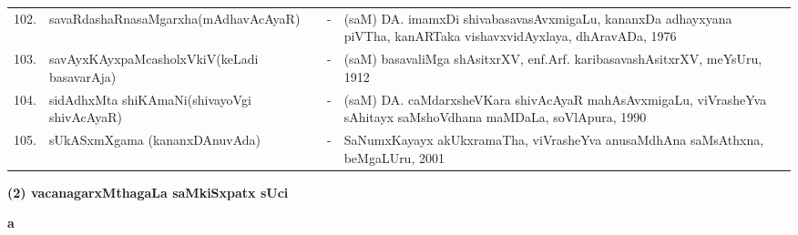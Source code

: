 {\begin{longtable}{lp{5cm}cp{5cm}<{\raggedright}p{3cm}<{\raggedright}@{}}
102. & savaRdashaRnasaMgarxha\newline (mAdhavAcAyaR) &-& (saM) DA. imamxDi shivabasavasAvxmigaLu, kananxDa adhayxyana piVTha, kanARTaka vishavxvidAyxlaya, dhAravADa, 1976\\
103. & savAyxKAyxpaMcasholxVkiV\newline (keLadi basavarAja) &-& (saM) basavaliMga shAsitxrXV, enf.Arf. karibasavashAsitxrXV, meYsUru, 1912\\
104. & sidAdhxMta shiKAmaNi\newline (shivayoVgi shivAcAyaR) &-& (saM) DA. caMdarxsheVKara shivAcAyaR mahAsAvxmigaLu, viVrasheYva sAhitayx saMshoVdhana maMDaLa, soVlApura, 1990\\
105. & sUkASxmXgama (kananxDAnuvAda) &-& SaNumxKayayx akUkxramaTha, viVrasheYva anusaMdhAna saMsAthxna, beMgaLUru, 2001\\
\hline
\end{longtable}}


\newpage

\begin{center}
{\large\bf (2) vacanagarxMthagaLa saMkiSxpatx sUci}
\end{center}

\medskip

\centerline{\bf a}

\medskip

